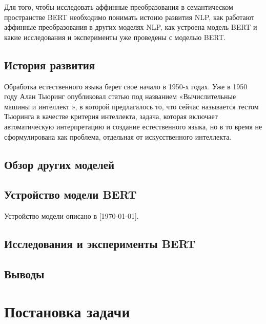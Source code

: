 \documentclass[a4paper,14pt]{article}
\begin{document}
	Для того, чтобы исследовать аффинные преобразования в семантическом пространстве BERT необходимо понимать истоию развития NLP, как работают аффинные преобразования в других моделях NLP, как устроена модель BERT и какие исследования и эксперименты уже проведены с моделью BERT.
	
	\subsection{История развития}
	
	Обработка естественного языка берет свое начало в 1950-х годах. Уже в 1950 году Алан Тьюринг опубликовал статью под названием «Вычислительные машины и интеллект », в которой предлагалось то, что сейчас называется тестом Тьюринга в качестве критерия интеллекта, задача, которая включает автоматическую интерпретацию и создание естественного языка, но в то время не сформулирована как проблема, отдельная от искусственного интеллекта.
	
	
	\subsection{Обзор других моделей}
	
	
	
	\subsection{Устройство модели BERT}
	
	Устройство модели описано в [\today].  
	
	\subsection{Исследования и эксперименты BERT}
	
	\subsection{Выводы}

	\pagebreak
	
	\section{Постановка задачи}

	\pagebreak
	
	
	
\end{document}
